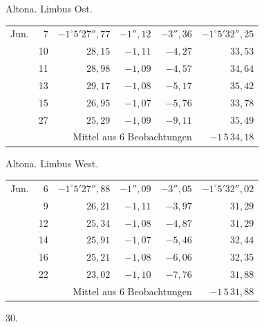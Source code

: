 \noindent\begin{minipage}[t]{.495\textwidth}\centering Altona. Limbus Ost.\par\smallskip
{\scriptsize\setlength{\tabcolsep}{1pt}\renewcommand{\arraystretch}{1.2}\begin{tabular}{lr|r|r|r|r|}
Jun.&7&$-1^\circ5'27''{,}77$&$-1''{,}12$&$-3''{,}36$&$-1^\circ5'32''{,}25$\\
&10&$28{,}15$&$-1{,}11$&$-4{,}27$&$33{,}53$\\
&11&$28{,}98$&$-1{,}09$&$-4{,}57$&$34{,}64$\\
&13&$29{,}17$&$-1{,}08$&$-5{,}17$&$35{,}42$\\
&15&$26{,}95$&$-1{,}07$&$-5{,}76$&$33{,}78$\\
&27&$25{,}29$&$-1{,}09$&$-9{,}11$&$35{,}49$\\
\cline{6-6}\multicolumn{5}{r}{Mittel aus 6 Beobachtungen}&$-1\,5\,34{,}18$
\end{tabular}}\end{minipage}\hfill\begin{minipage}[t]{.495\textwidth}\centering Altona. Limbus West.\par\smallskip
{\scriptsize\setlength{\tabcolsep}{1pt}\renewcommand{\arraystretch}{1.2}\begin{tabular}{lr|r|r|r|r}
Jun.&6&$-1^\circ5'27''{,}88$&$-1''{,}09$&$-3''{,}05$&$-1^\circ5'32''{,}02$\\
&9&$26{,}21$&$-1{,}11$&$-3{,}97$&$31{,}29$\\
&12&$25{,}34$&$-1{,}08$&$-4{,}87$&$31{,}29$\\
&14&$25{,}91$&$-1{,}07$&$-5{,}46$&$32{,}44$\\
&16&$25{,}21$&$-1{,}08$&$-6{,}06$&$32{,}35$\\
&22&$23{,}02$&$-1{,}10$&$-7{,}76$&$31{,}88$\\
\cline{6-6}\multicolumn{5}{r}{Mittel aus 6 Beobachtungen}&$-1\,5\,31{,}88$
\end{tabular}}\end{minipage}
\par\vspace{4mm}
\begin{center}30.\end{center}

